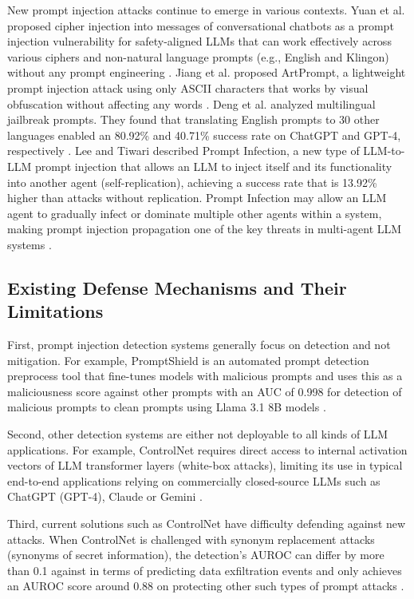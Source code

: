 \documentclass[10pt, conference, compsoc]{IEEEtran}
\begin{document}
New prompt injection attacks continue to emerge in various contexts. Yuan et al. proposed cipher injection into messages of conversational chatbots as a prompt injection vulnerability for safety-aligned LLMs that can work effectively across various ciphers and non-natural language prompts (e.g., English and Klingon) without any prompt engineering \cite{yuan2024cipherchat}. Jiang et al. proposed ArtPrompt, a lightweight prompt injection attack using only ASCII characters that works by visual obfuscation without affecting any words \cite{jiang2024artprompt}. Deng et al. analyzed multilingual jailbreak prompts. They found that translating English prompts to 30 other languages enabled an 80.92\% and 40.71\% success rate on ChatGPT and GPT-4, respectively \cite{deng2024multilingual}. Lee and Tiwari described Prompt Infection, a new type of LLM-to-LLM prompt injection that allows an LLM to inject itself and its functionality into another agent (self-replication), achieving a success rate that is 13.92\% higher than attacks without replication. Prompt Infection may allow an LLM agent to gradually infect or dominate multiple other agents within a system, making prompt injection propagation one of the key threats in multi-agent LLM systems \cite{lee2024promptinfection}.

\subsection{Existing Defense Mechanisms and Their Limitations}

First, prompt injection detection systems generally focus on detection and not mitigation. For example, PromptShield is an automated prompt detection preprocess tool that fine-tunes models with malicious prompts and uses this as a maliciousness score against other prompts with an AUC of 0.998 for detection of malicious prompts to clean prompts using Llama 3.1 8B models \cite{jacob2024promptshield}.

Second, other detection systems are either not deployable to all kinds of LLM applications. For example, ControlNet requires direct access to internal activation vectors of LLM transformer layers (white-box attacks), limiting its use in typical end-to-end applications relying on commercially closed-source LLMs such as ChatGPT (GPT-4), Claude or Gemini \cite{yao2025controlnet}.

Third, current solutions such as ControlNet have difficulty defending against new attacks. When ControlNet is challenged with synonym replacement attacks (synonyms of secret information), the detection's AUROC can differ by more than 0.1 against in terms of predicting data exfiltration events and only achieves an AUROC score around 0.88 on protecting other such types of prompt attacks \cite{yao2025controlnet}.
\end{document}
